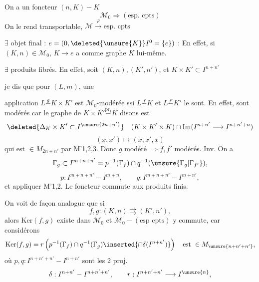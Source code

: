 On a un foncteur $(n,K)-K$
\[
\mathcal M_0\Longrightarrow(\text{esp. cpts})
\]
On le rend transportable,  $\mathcal M\xrightarrow{\varphi}\text{esp. cpts}$

$\exists$ objet final : $e=(0,\deleted{\unsure{K}}I^0=\{e\})$ : En effet, si $(K,n)\in\mathcal M_0$, $K\longrightarrow e$ a comme graphe $K$ lui-même.

$\exists$ produits fibrés.  En effet, soit
$(K,n),(K',n')$, et $K\times K'\subset I^{n+n'}$

je dis que pour $(L,m)$, une


application $L\mathrel{\overset{g}{-}}K\times K'$ est $\mathcal M_0$-modérée ssi $L\mathrel{\overset{f}{-}}K$ et $L\mathrel{\overset{f'}{-}}K'$ le sont. En effet, 
sont modérés car le graphe de $K\times K'\mathrel{\overset{\mathrm{pr}_1}{-}}K$ disons est
\[
\deleted{\Delta_K\times K'\subset I^{\unsure{2n+n'}}}\quad
(K\times K'\times K)\cap
\mathrm{Im}(I^{n+n'}\longrightarrow I^{n+n'+n})
\]
\[
(x,x')\longmapsto(x,x',x)
\]
qui est $\in M_{2n+n'}$ par M'1,2,3. Donc $g$ modéré $\Rightarrow f,f'$ modérés.
Inv. On a
\[
\Gamma_g\subset I^{m+n+n'}
=p^{-1}(\Gamma_f)\cap q^{-1}(\unsure{\Gamma_g|\Gamma_{f'}}),
\]
\[
p:I^{m+n+n'}-I^{m+n},\qquad q:I^{m+n+n'}-I^{m+n'},
\]
et appliquer M'1,2. Le foncteur   commute aux produits finis.

On voit de façon analogue que si
\[
f,g:(K,n)\rightrightarrows(K',n'),
\]
alors $\mathrm{Ker}(f,g)$ existe dans $\mathcal M_0$ et $\mathcal M_0-(\text{esp cpts})$ y commute, car considérons
\[
\mathrm{Ker}(f,g)=r\left(p^{-1}(\Gamma_f)\cap q^{-1}(\Gamma_g)
\inserted{\cap\delta(I^{n+n'})}\right)
\quad\text{est }\in M_{\unsure{n+n'+n'}},
\]
où $p,q:I^{n+n'+n'}-I^{n+n'}$ sont les 2 proj.
\[
\delta:I^{n+n'}-I^{n+n'+n'},\qquad
r:I^{n+n'+n'}\longrightarrow I^{\unsure{n}},
\]

